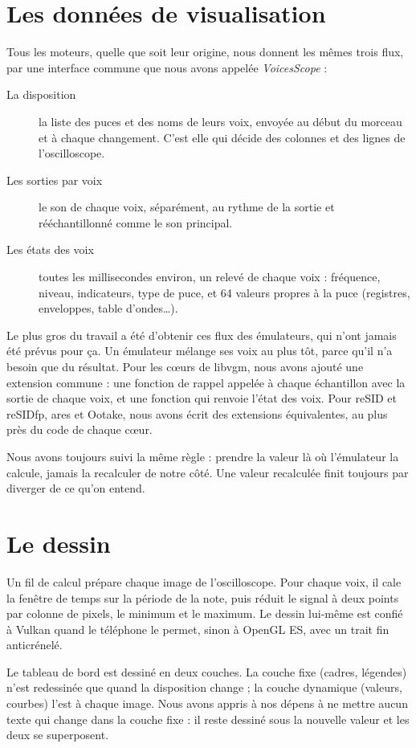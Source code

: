 \section{Les données de visualisation}
Tous les moteurs, quelle que soit leur origine, nous donnent les mêmes trois flux, par une interface commune que
nous avons appelée \emph{VoicesScope} :
\begin{description}
  \item[La disposition] la liste des puces et des noms de leurs voix, envoyée au début du morceau et à chaque
        changement. C'est elle qui décide des colonnes et des lignes de l'oscilloscope.
  \item[Les sorties par voix] le son de chaque voix, séparément, au rythme de la sortie et rééchantillonné comme le
        son principal.
  \item[Les états des voix] toutes les millisecondes environ, un relevé de chaque voix : fréquence, niveau,
        indicateurs, type de puce, et 64 valeurs propres à la puce (registres, enveloppes, table d'ondes\dots).
\end{description}
Le plus gros du travail a été d'obtenir ces flux des émulateurs, qui n'ont jamais été prévus pour ça. Un émulateur
mélange ses voix au plus tôt, parce qu'il n'a besoin que du résultat. Pour les cœurs de libvgm, nous avons ajouté une
extension commune : une fonction de rappel appelée à chaque échantillon avec la sortie de chaque voix, et une
fonction qui renvoie l'état des voix. Pour reSID et reSIDfp, ares et Ootake, nous avons écrit des extensions
équivalentes, au plus près du code de chaque cœur.

Nous avons toujours suivi la même règle : prendre la valeur là où l'émulateur la calcule, jamais la recalculer de
notre côté. Une valeur recalculée finit toujours par diverger de ce qu'on entend.

\section{Le dessin}
Un fil de calcul prépare chaque image de l'oscilloscope. Pour chaque voix, il cale la fenêtre de temps sur la
période de la note, puis réduit le signal à deux points par colonne de pixels, le minimum et le maximum. Le dessin
lui-même est confié à Vulkan quand le téléphone le permet, sinon à OpenGL ES, avec un trait fin anticrénelé.

Le tableau de bord est dessiné en deux couches. La couche fixe (cadres, légendes) n'est redessinée que quand la
disposition change ; la couche dynamique (valeurs, courbes) l'est à chaque image. Nous avons appris à nos dépens à
ne mettre aucun texte qui change dans la couche fixe : il reste dessiné sous la nouvelle valeur et les deux se
superposent.

